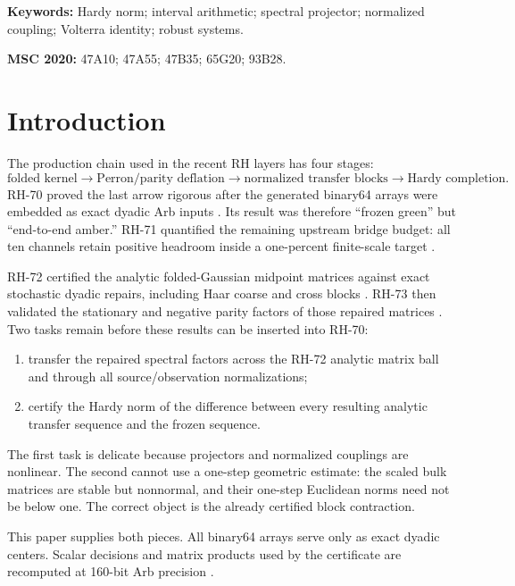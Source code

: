 \documentclass[11pt]{article}
\theoremstyle{definition}
\begin{document}
\noindent\textbf{Keywords:} Hardy norm; interval arithmetic; spectral
projector; normalized coupling; Volterra identity; robust systems.

\medskip
\noindent\textbf{MSC 2020:} 47A10; 47A55; 47B35; 65G20; 93B28.

\section{Introduction}

The production chain used in the recent RH layers has four stages:
\begin{equation}
 \text{folded kernel}
 \longrightarrow \text{Perron/parity deflation}
 \longrightarrow \text{normalized transfer blocks}
 \longrightarrow \text{Hardy completion}.
 \label{eq:chain}
\end{equation}
RH-70 proved the last arrow rigorous after the generated binary64 arrays were
embedded as exact dyadic Arb inputs \citep{WangFrozen2026}.  Its result was
therefore ``frozen green'' but ``end-to-end amber.''  RH-71 quantified the
remaining upstream bridge budget: all ten channels retain positive headroom
inside a one-percent finite-scale target \citep{WangReview2026}.

RH-72 certified the analytic folded-Gaussian midpoint matrices against exact
stochastic dyadic repairs, including Haar coarse and cross blocks
\citep{WangAssembly2026}.  RH-73 then validated the stationary and negative
parity factors of those repaired matrices \citep{WangPeripheral2026}.  Two
tasks remain before these results can be inserted into RH-70:

\begin{enumerate}[leftmargin=2.2em]
 \item transfer the repaired spectral factors across the RH-72 analytic
       matrix ball and through all source/observation normalizations;
 \item certify the Hardy norm of the difference between every resulting
       analytic transfer sequence and the frozen sequence.
\end{enumerate}

The first task is delicate because projectors and normalized couplings are
nonlinear.  The second cannot use a one-step geometric estimate: the scaled
bulk matrices are stable but nonnormal, and their one-step Euclidean norms
need not be below one.  The correct object is the already certified block
contraction.

This paper supplies both pieces.  All binary64 arrays serve only as exact
dyadic centers.  Scalar decisions and matrix products used by the certificate
are recomputed at 160-bit Arb precision \citep{Johansson2017,Higham2002}.
\end{document}
